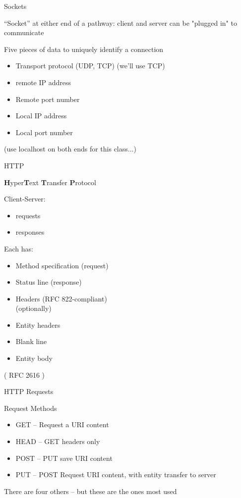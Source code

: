 \documentclass{beamer}
\begin{document}
\begin{frame}[fragile]{Sockets}

{\Large ``Socket'' at either end of a pathway: client and server can be
"plugged in" to communicate}

{\Large Five pieces of data to uniquely identify a connection}

\begin{itemize}
  \item Transport protocol (UDP, TCP) (we'll use TCP)
  \item remote IP address
  \item Remote port number
  \item Local IP address
  \item Local port number 
\end{itemize}

\vfill
(use localhost on both ends for this class...)
\end{frame} 

\begin{frame}[fragile]{HTTP}

{\LARGE {\bf H}yper{\bf T}ext {\bf T}ransfer {\bf P}rotocol}

 {\Large Client-Server: }
\begin{itemize}
  \item requests
  \item responses
\end{itemize}

{\Large Each has:}

\begin{itemize}
  \item Method specification (request)
  \item Status line (response)
  \item  Headers (RFC 822-compliant)\\[0.1in]
  (optionally)
  \item Entity headers
  \item Blank line
  \item Entity body
\end{itemize}
 
\vfill
 ( RFC 2616 )

\end{frame} 

\begin{frame}{HTTP Requests}

{\Large Request Methods  }

\begin{itemize}
  \item GET -- Request a URI content
  \item HEAD -- GET headers only
  \item POST -- PUT save URI content
  \item PUT  -- POST Request URI content, with entity transfer to server
\end{itemize}

\vfill
There are four others -- but these are the ones most used
\end{frame}
\end{document}
